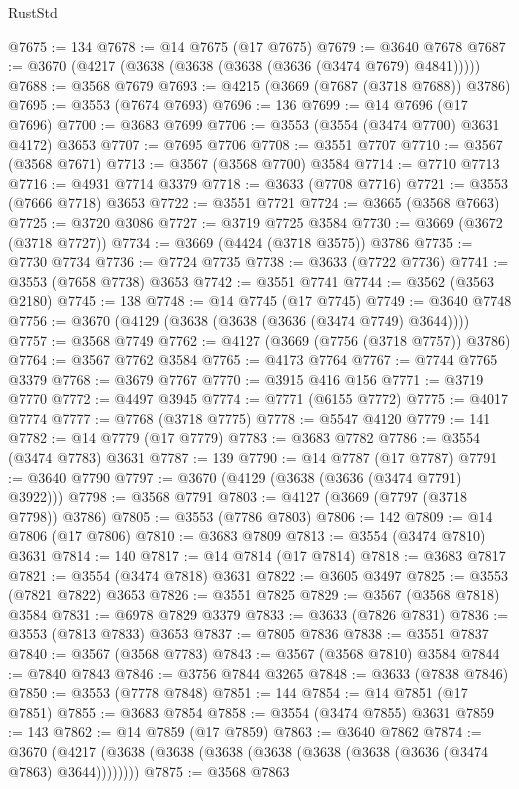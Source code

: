 \begin{lexlean}{RustStd}
\begin{coremodule}
@7675 := 134
@7678 := @14 @7675 (@17 @7675)
@7679 := @3640 @7678
@7687 := @3670 (@4217 (@3638 (@3638 (@3638 (@3636 (@3474 @7679) @4841)))))
@7688 := @3568 @7679
@7693 := @4215 (@3669 (@7687 (@3718 @7688)) @3786)
@7695 := @3553 (@7674 @7693)
@7696 := 136
@7699 := @14 @7696 (@17 @7696)
@7700 := @3683 @7699
@7706 := @3553 (@3554 (@3474 @7700) @3631 @4172) @3653
@7707 := @7695 @7706
@7708 := @3551 @7707
@7710 := @3567 (@3568 @7671)
@7713 := @3567 (@3568 @7700) @3584
@7714 := @7710 @7713
@7716 := @4931 @7714 @3379
@7718 := @3633 (@7708 @7716)
@7721 := @3553 (@7666 @7718) @3653
@7722 := @3551 @7721
@7724 := @3665 (@3568 @7663)
@7725 := @3720 @3086
@7727 := @3719 @7725 @3584
@7730 := @3669 (@3672 (@3718 @7727))
@7734 := @3669 (@4424 (@3718 @3575)) @3786
@7735 := @7730 @7734
@7736 := @7724 @7735
@7738 := @3633 (@7722 @7736)
@7741 := @3553 (@7658 @7738) @3653
@7742 := @3551 @7741
@7744 := @3562 (@3563 @2180)
@7745 := 138
@7748 := @14 @7745 (@17 @7745)
@7749 := @3640 @7748
@7756 := @3670 (@4129 (@3638 (@3638 (@3636 (@3474 @7749) @3644))))
@7757 := @3568 @7749
@7762 := @4127 (@3669 (@7756 (@3718 @7757)) @3786)
@7764 := @3567 @7762 @3584
@7765 := @4173 @7764
@7767 := @7744 @7765 @3379
@7768 := @3679 @7767
@7770 := @3915 @416 @156
@7771 := @3719 @7770
@7772 := @4497 @3945
@7774 := @7771 (@6155 @7772)
@7775 := @4017 @7774
@7777 := @7768 (@3718 @7775)
@7778 := @5547 @4120
@7779 := 141
@7782 := @14 @7779 (@17 @7779)
@7783 := @3683 @7782
@7786 := @3554 (@3474 @7783) @3631
@7787 := 139
@7790 := @14 @7787 (@17 @7787)
@7791 := @3640 @7790
@7797 := @3670 (@4129 (@3638 (@3636 (@3474 @7791) @3922)))
@7798 := @3568 @7791
@7803 := @4127 (@3669 (@7797 (@3718 @7798)) @3786)
@7805 := @3553 (@7786 @7803)
@7806 := 142
@7809 := @14 @7806 (@17 @7806)
@7810 := @3683 @7809
@7813 := @3554 (@3474 @7810) @3631
@7814 := 140
@7817 := @14 @7814 (@17 @7814)
@7818 := @3683 @7817
@7821 := @3554 (@3474 @7818) @3631
@7822 := @3605 @3497
@7825 := @3553 (@7821 @7822) @3653
@7826 := @3551 @7825
@7829 := @3567 (@3568 @7818) @3584
@7831 := @6978 @7829 @3379
@7833 := @3633 (@7826 @7831)
@7836 := @3553 (@7813 @7833) @3653
@7837 := @7805 @7836
@7838 := @3551 @7837
@7840 := @3567 (@3568 @7783)
@7843 := @3567 (@3568 @7810) @3584
@7844 := @7840 @7843
@7846 := @3756 @7844 @3265
@7848 := @3633 (@7838 @7846)
@7850 := @3553 (@7778 @7848)
@7851 := 144
@7854 := @14 @7851 (@17 @7851)
@7855 := @3683 @7854
@7858 := @3554 (@3474 @7855) @3631
@7859 := 143
@7862 := @14 @7859 (@17 @7859)
@7863 := @3640 @7862
@7874 := @3670 (@4217 (@3638 (@3638 (@3638 (@3638 (@3638 (@3638 (@3636 (@3474 @7863) @3644))))))))
@7875 := @3568 @7863

\end{coremodule}
\end{lexlean}
